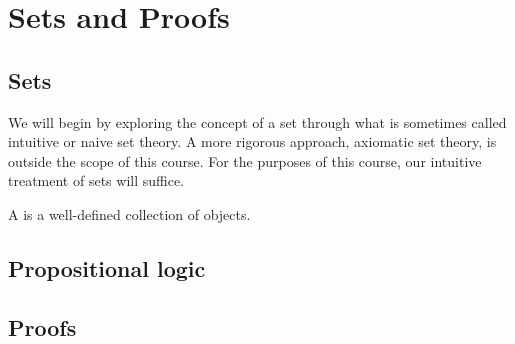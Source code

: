 \chapter{Sets and Proofs}

\section{Sets}

We will begin by exploring the concept of a set through what is sometimes called intuitive or naive set theory. A more rigorous approach, axiomatic set theory, is outside the scope of this course. For the purposes of this course, our intuitive treatment of sets will suffice.

\begin{defn}
A  is a well-defined collection of objects.
\end{defn}

\section{Propositional logic}

\section{Proofs}